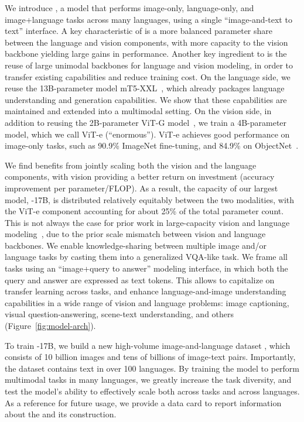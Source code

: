 \documentclass{article}
\begin{document}
We introduce \NAME, a model that performs image-only, language-only, and image+language tasks across many languages, using a single ``image-and-text to text'' interface.
A key characteristic of \NAME is a more balanced parameter share between the language and vision components, with more capacity to the vision backbone yielding large gains in performance.
Another key ingredient to \NAME is the reuse of large unimodal backbones for language and vision modeling, in order to transfer existing capabilities and reduce training cost.
On the language side, we reuse the 13B-parameter model mT5-XXL~\citep{xue-2021-mt5}, which already packages language understanding and generation capabilities.
We show that these capabilities are maintained and extended into a multimodal setting.
On the vision side, in addition to reusing the 2B-parameter ViT-G model~\citep{zhai-21-scalingvit}, we train a 4B-parameter model, which we call ViT-e (``enormous'').
ViT-e achieves good performance on image-only tasks, such as 90.9\% ImageNet fine-tuning, and 84.9\% on ObjectNet~\citep{objectnet}.

We find benefits from jointly scaling both the vision and the language components, with vision providing a better return on investment (accuracy improvement per parameter/FLOP).
As a result, the capacity of our largest \NAME model, \NAME-17B, is distributed relatively equitably between the two modalities, with the ViT-e component accounting for about 25\% of the total parameter count.
This is not always the case for prior work in large-capacity vision and language modeling~\citep{git,flamingo}, due to the prior scale mismatch between vision and language backbones. We enable knowledge-sharing between multiple image and/or language tasks by casting them into a generalized VQA-like task.
We frame all tasks using an ``image+query to answer'' modeling interface, in which both the query and answer are expressed as text tokens.
This allows \NAME to capitalize on transfer learning across tasks, and enhance language-and-image understanding capabilities
in a wide range of vision and language problems:
image captioning, visual question-answering, scene-text understanding, and others (Figure~\ref{fig:model-arch}).

To train \NAME-17B, we build a new high-volume image-and-language dataset \PTDATA, which consists of 10 billion images and tens of billions of image-text pairs.
Importantly, the \PTDATA dataset contains text in over 100 languages.
By training the model to perform multimodal tasks in many languages, we greatly increase the task diversity, and test the model's ability to effectively scale both across tasks and across languages.
As a reference for future usage, we provide a data card to report information about the \PTDATA and its construction.
\end{document}
